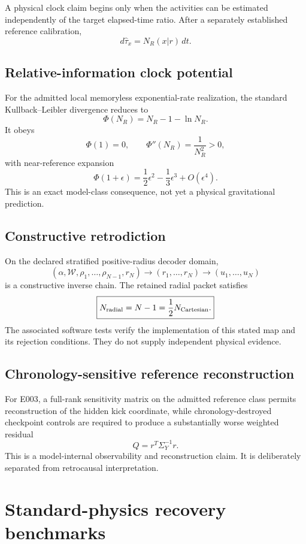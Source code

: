 \documentclass[11pt]{book}
\begin{document}
A physical clock claim begins only when the activities can be estimated independently of the target elapsed-time ratio. After a separately established reference calibration,
\[
d\widehat\tau_x=N_R(x|r)\,dt.
\]

\subsection{Relative-information clock potential}

For the admitted local memoryless exponential-rate realization, the standard Kullback--Leibler divergence \cite{KullbackLeibler1951} reduces to
\[
\boxed{
\Phi(N_R)=N_R-1-\ln N_R.
}
\]
It obeys
\[
\Phi(1)=0,
\qquad
\Phi''(N_R)=\frac{1}{N_R^2}>0,
\]
with near-reference expansion
\[
\Phi(1+\epsilon)=\frac12\epsilon^2-\frac13\epsilon^3+O(\epsilon^4).
\]
This is an exact model-class consequence, not yet a physical gravitational prediction.

\subsection{Constructive retrodiction}

On the declared stratified positive-radius decoder domain,
\[
(\alpha,\mathcal W,\rho_1,\ldots,\rho_{N-1},r_N)
\longrightarrow
(r_1,\ldots,r_N)
\longrightarrow
(u_1,\ldots,u_N)
\]
is a constructive inverse chain. The retained radial packet satisfies
\[
\boxed{
N_{\rm radial}=N-1
=\frac12N_{\rm Cartesian}.
}
\]
The associated software tests verify the implementation of this stated map and its rejection conditions. They do not supply independent physical evidence.

\subsection{Chronology-sensitive reference reconstruction}

For E003, a full-rank sensitivity matrix on the admitted reference class permits reconstruction of the hidden kick coordinate, while chronology-destroyed checkpoint controls are required to produce a substantially worse weighted residual
\[
Q=r^T\Sigma_Y^{-1}r.
\]
This is a model-internal observability and reconstruction claim. It is deliberately separated from retrocausal interpretation.

\section{Standard-physics recovery benchmarks}
\end{document}
